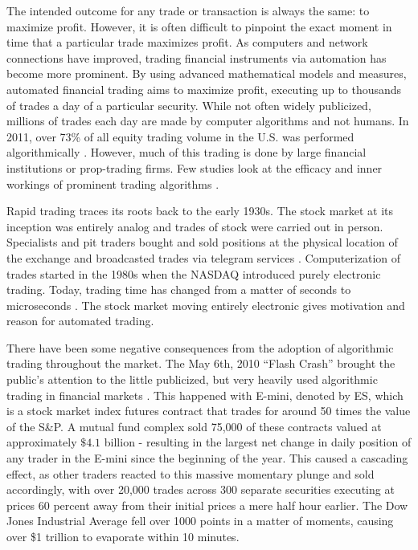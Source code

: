 \documentclass[../thesis.tex]{subfiles}
\begin{document}
 The intended outcome for any trade or transaction is always the same: to maximize profit. However, it is often difficult to pinpoint the exact moment in time that a particular trade maximizes profit. As computers and network connections have improved, trading financial instruments via automation has become more prominent. By using advanced mathematical models and measures, automated financial trading aims to maximize profit, executing up to thousands of trades a day of a particular security. While not often widely publicized, millions of trades each day are made by computer algorithms and not humans. In 2011, over 73\% of all equity trading volume in the U.S. was performed algorithmically \cite{Treleaven2013}. However, much of this trading is done by large financial institutions or prop-trading firms. Few studies look at the efficacy and inner workings of prominent trading algorithms \cite{Ehlers} \cite{Gatev2006}. 
  
 Rapid trading traces its roots back to the early 1930s. The stock market at its inception was entirely analog and trades of stock were carried out in person. Specialists and pit traders bought and sold positions at the physical location of the exchange and broadcasted trades via telegram services \cite{Treleaven2013}.  Computerization of trades started in the 1980s when the NASDAQ introduced purely electronic trading. Today, trading time has changed from a matter of seconds to microseconds \cite{Treleaven2013}. The stock market moving entirely electronic gives motivation and reason for automated trading. 
 

There have been some negative consequences from the adoption of algorithmic trading throughout the market. The May 6th, 2010 ``Flash Crash'' brought the public's attention to the little publicized, but very heavily used algorithmic trading in financial markets \cite{Kirilenko2017}. This happened with E-mini, denoted by ES, which is a stock market index futures contract that trades for around 50 times the value of the S\&P. A mutual fund complex sold 75,000 of these contracts valued at approximately $\$4.1$ billion - resulting in the largest net change in daily position of any trader in the E-mini since the beginning of the year. This caused a cascading effect, as other traders reacted to this massive momentary plunge and sold accordingly, with over 20,000 trades across 300 separate securities executing at prices 60 percent away from their initial prices a mere half hour earlier. The Dow Jones Industrial Average fell over 1000 points in a matter of moments, causing over \$1 trillion to evaporate within 10 minutes. 
\end{document}
